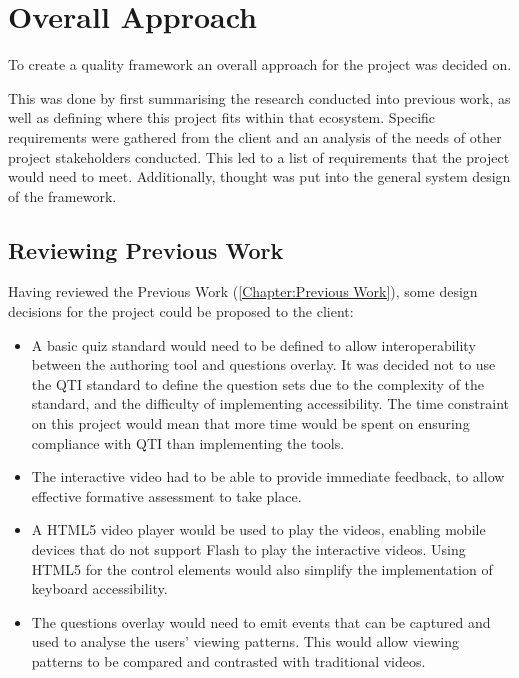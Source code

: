 \chapter{Overall Approach}
\label{Chapter:Overall Approach}

\begin{preamble}
	To create a quality framework an overall approach for the project was decided on.

	This was done by first summarising the research conducted into previous work, as well as defining where this project fits within that ecosystem. Specific requirements were gathered from the client and an analysis of the needs of other project stakeholders conducted. This led to a list of requirements that the project would need to meet. Additionally, thought was put into the general system design of the framework.
\end{preamble}

\section{Reviewing Previous Work}
Having reviewed the Previous Work (\autoref{Chapter:Previous Work}), some design decisions for the project could be proposed to the client:
\begin{itemize}
	\item A basic quiz standard would need to be defined to allow interoperability between the authoring tool and questions overlay. It was decided not to use the \gls{QTI} standard to define the question sets due to the complexity of the standard, and the difficulty of implementing accessibility. The time constraint on this project would mean that more time would be spent on ensuring compliance with \gls{QTI} than implementing the tools.

	\item The interactive video had to be able to provide immediate feedback, to allow effective formative assessment to take place.

	\item A \gls{HTML5} video player would be used to play the videos, enabling mobile devices that do not support Flash to play the interactive videos. Using \gls{HTML5} for the control elements would also simplify the implementation of keyboard accessibility.

	\item The questions overlay would need to emit events that can be captured and used to analyse the users' viewing patterns. This would allow viewing patterns to be compared and contrasted with traditional videos.
\end{itemize}

